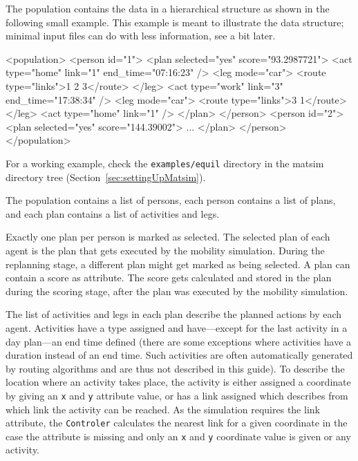 The population contains the data in a hierarchical structure as shown in the following small example.  This example is meant to illustrate the data structure; minimal input files can do with less information, see a bit later.
\begin{xml}
<population> 
   <person id="1"> 
      <plan selected="yes" score="93.2987721"> 
         <act type="home" link="1" end_time="07:16:23" /> 
         <leg mode="car"> 
            <route type="links">1 2 3</route> 
         </leg> 
         <act type="work" link="3" end_time="17:38:34" /> 
         <leg mode="car"> 
            <route type="links">3 1</route> 
         </leg> 
         <act type="home" link="1" /> 
      </plan> 
   </person> 
   <person id="2"> 
      <plan selected="yes" score="144.39002"> 
         ...
      </plan> 
   </person> 
</population>
\end{xml}
For a working example, check the \lstinline{examples/equil} directory in the \gls{matsim} directory tree (\cf Section~\ref{sec:settingUpMatsim}).

The population contains a list of persons, each person contains a list of plans, and each plan contains a list of activities and legs.

Exactly one \gls{plan} per person is marked as selected. The selected plan of each agent is the plan that gets executed by the mobility simulation. During the \gls{replanning} stage, a different plan might get marked as being selected. A \gls{plan} can contain a score as attribute. The score gets calculated and stored in the plan during the scoring stage, after the plan was executed by the mobility simulation.

The list of activities and legs in each plan describe the planned actions by each agent. Activities have a type assigned and have---except for the last activity in a day plan---an end time defined (there are some exceptions where activities have a duration instead of an end time. Such activities are often automatically generated by routing algorithms and are thus not described in this guide). To describe the location where an activity takes place, the activity is either assigned a coordinate by giving an \lstinline|x| and \lstinline|y| attribute value, or has a link assigned which describes from which link the activity can be reached. As the simulation requires the link attribute, the \lstinline|Controler| calculates the nearest link for a given coordinate in the case the attribute is missing and only an \lstinline|x| and \lstinline|y| coordinate value is given or any activity.

